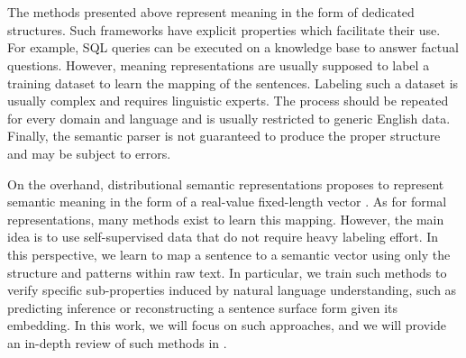 \section{}

The methods presented above represent meaning in the form of dedicated structures. Such frameworks have explicit properties which facilitate their use. For example, SQL queries can be executed on a knowledge base to answer factual questions. However, meaning representations are usually supposed to label a training dataset to learn the mapping of the sentences. Labeling such a dataset is usually complex and requires linguistic experts. The process should be repeated for every domain and language and is usually restricted to generic English data. Finally, the semantic parser is not guaranteed to produce the proper structure and may be subject to errors.

On the overhand, distributional semantic representations proposes to represent semantic meaning in the form of a real-value fixed-length vector \textcite{jurafsky_2009}. As for formal representations, many methods exist to learn this mapping. However, the main idea is to use self-supervised data that do not require heavy labeling effort. In this perspective, we learn to map a sentence to a semantic vector using only the structure and patterns within raw text. In particular, we train such methods to verify specific sub-properties induced by natural language understanding, such as predicting inference or reconstructing a sentence surface form given its embedding. In this work, we will focus on such approaches, and we will provide an in-depth review of such methods in .



